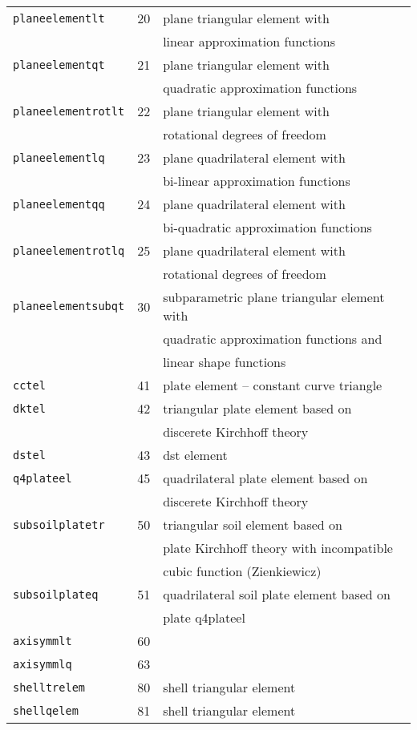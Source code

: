 \begin{center}
\begin{tabular}{|l|c|l|}
\hline
{\tt planeelementlt} & 20 & plane triangular element with
\\
 & & linear approximation functions
\\ \hline
{\tt planeelementqt} & 21 & plane triangular element with
\\
 & & quadratic approximation functions
\\ \hline
{\tt planeelementrotlt} & 22 & plane triangular element with
\\
 & & rotational degrees of freedom
\\ \hline
{\tt planeelementlq} & 23 & plane quadrilateral element with
\\
 & & bi-linear approximation functions
\\ \hline
{\tt planeelementqq} & 24 & plane quadrilateral element with
\\
 & & bi-quadratic approximation functions
\\ \hline
{\tt planeelementrotlq} & 25 & plane quadrilateral element with
\\
 & & rotational degrees of freedom
\\ \hline
{\tt planeelementsubqt} & 30 & subparametric plane triangular element with
\\
 & & quadratic approximation functions and
\\
 & & linear shape functions
\\ \hline
{\tt cctel} & 41 & plate element -- constant curve triangle
\\ \hline
{\tt dktel} & 42 & triangular plate element based on
\\
 & & discerete Kirchhoff theory
\\ \hline
{\tt dstel} & 43 & dst element
\\ \hline
{\tt q4plateel} & 45 & quadrilateral plate element based on
\\
 & & discerete Kirchhoff theory
\\ \hline
{\tt subsoilplatetr} & 50 & triangular soil element based on
\\
 & & plate Kirchhoff theory with incompatible
\\
 & & cubic function (Zienkiewicz)
\\ \hline
{\tt subsoilplateq} & 51 & quadrilateral soil plate element based on
\\
 & & plate q4plateel
\\ \hline
{\tt axisymmlt} & 60 &
\\ \hline
{\tt axisymmlq} & 63 &
\\ \hline
{\tt shelltrelem} & 80 & shell triangular element
\\ \hline
{\tt shellqelem} & 81 & shell triangular element
\\ \hline
\end{tabular}


\end{center}
